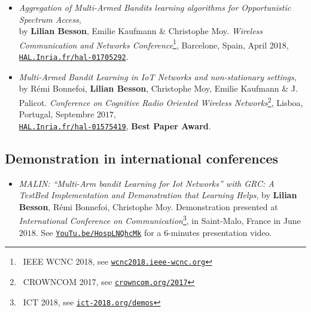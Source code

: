 \begin{itemize}
\item
    \emph{Aggregation of Multi-Armed Bandits learning algorithms for Opportunistic Spectrum Access},\\
    by \textbf{Lilian Besson}, Emilie Kaufmann \& Christophe Moy.
    \emph{Wireless Communication and Networks Conference}\footnote{~IEEE WCNC 2018, see \href{http://wcnc2018.ieee-wcnc.org}{\texttt{wcnc2018.ieee-wcnc.org}}}, Barcelone, Spain, April 2018,\\
    \href{https://HAL.Inria.fr/hal-01705292}{\texttt{HAL.Inria.fr/hal-01705292}}.
    \cite{Besson2018WCNC}

\item
    \emph{Multi-Armed Bandit Learning in IoT Networks and non-stationary settings},
    by Rémi Bonnefoi, \textbf{Lilian Besson}, Christophe Moy, Emilie Kaufmann \& J. Palicot.
    \emph{Conference on Cognitive Radio Oriented Wireless Networks}\footnote{~CROWNCOM 2017, see \href{http://crowncom.org/2017}{\texttt{crowncom.org/2017}}}, Lisboa, Portugal, Septembre $2017$,\\
    \href{https://HAL.Inria.fr/hal-01575419}{\texttt{HAL.Inria.fr/hal-01575419}},
    \textbf{Best Paper Award}.
    \cite{Bonnefoi17}

\end{itemize}

\subsection{Demonstration in international conferences}

\begin{itemize}

\item
    \emph{MALIN: ``Multi-Arm bandit Learning for Iot Networks'' with GRC: A TestBed Implementation and Demonstration that Learning Helps},
    by \textbf{Lilian Besson}, Rémi Bonnefoi, Christophe Moy.
    Demonstration presented at \emph{International Conference on Communication}\footnote{~ICT 2018, see \href{http://ict-2018.org/demos}{\texttt{ict-2018.org/demos}}}, in Saint-Malo, France in June $2018$.
    See \href{https://YouTu.be/HospLNQhcMk}{\texttt{YouTu.be/HospLNQhcMk}} for a $6$-minutes presentation video.
    \cite{Besson2018ICT}

\end{itemize}



